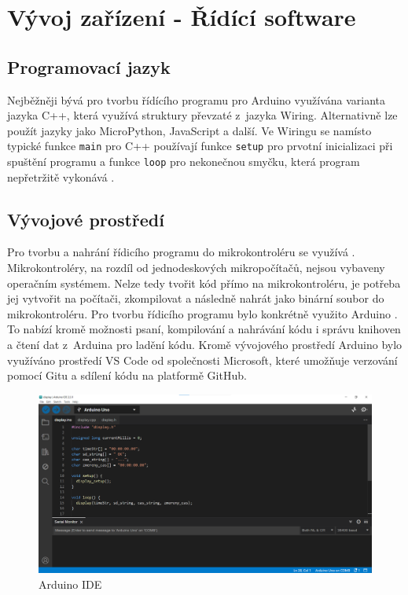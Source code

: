 \chapter{Vývoj zařízení - Řídící software}
\label{5-vyvoj-zarizeni-ridici-software}

\section{Programovací jazyk}

Nejběžněji bývá pro tvorbu řídícího programu pro Arduino využívána varianta jazyka C++, která využívá struktury převzaté z~jazyka Wiring. Alternativně lze použít jazyky jako MicroPython, JavaScript a další. Ve Wiringu se namísto typické funkce \texttt{main} pro C++ používají funkce \texttt{setup} pro prvotní inicializaci při spuštění programu a funkce \texttt{loop} pro nekonečnou smyčku, která program nepřetržitě vykonává \cite{arduino}.

\section{Vývojové prostředí}
Pro tvorbu a nahrání řídicího programu do mikrokontroléru se využívá . Mikrokontroléry, na rozdíl od jednodeskových mikropočítačů, nejsou vybaveny operačním systémem. Nelze tedy tvořit kód přímo na mikro\-kontroléru, je potřeba jej vytvořit na počítači, zkompilovat a následně nahrát jako binární soubor do mikro\-kontroléru. Pro tvorbu řídicího programu bylo konkrétně využito Arduino . To nabízí kromě možnosti psaní, kompilování a nahrávání kódu i správu knihoven a čtení dat z~Arduina pro ladění kódu. Kromě vývojového prostředí Arduino  bylo využíváno prostředí VS Code od společnosti Microsoft, které umožňuje verzování pomocí Gitu a sdílení kódu na platformě GitHub.

\begin{figure}[H]
	\centering
	\includegraphics[width=14.5cm]{images/komponenty/Arduino_IDE.png}
	\caption{Arduino IDE}
\end{figure}

